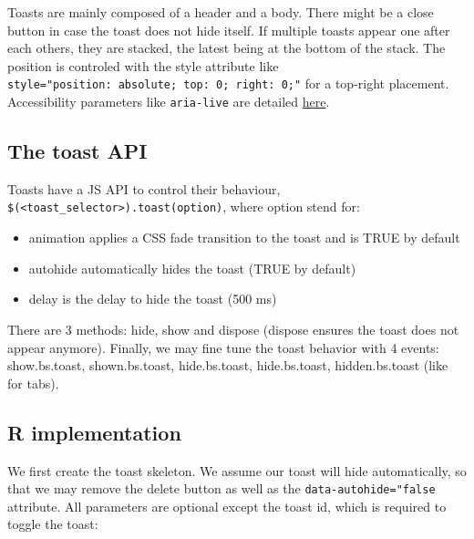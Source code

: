 \documentclass[]{book}
\providecommand{\tightlist}{%
  \setlength{\itemsep}{0pt}\setlength{\parskip}{0pt}}
\begin{document}
Toasts are mainly composed of a header and a body. There might be a close button in case the toast does not hide itself. If multiple toasts appear one after each others, they are stacked, the latest being at the bottom of the stack. The position is controled with the style attribute like \texttt{style="position:\ absolute;\ top:\ 0;\ right:\ 0;"} for a top-right placement. Accessibility parameters like \texttt{aria-live} are detailed \href{https://getbootstrap.com/docs/4.3/components/toasts/\#accessibility}{here}.

\hypertarget{the-toast-api}{%
\subsection{The toast API}\label{the-toast-api}}

Toasts have a JS API to control their behaviour, \texttt{\$(\textquotesingle{}\textless{}toast\_selector\textgreater{}\textquotesingle{}).toast(option)}, where option stend for:

\begin{itemize}
\tightlist
\item
  animation applies a CSS fade transition to the toast and is TRUE by default
\item
  autohide automatically hides the toast (TRUE by default)
\item
  delay is the delay to hide the toast (500 ms)
\end{itemize}

There are 3 methods: hide, show and dispose (dispose ensures the toast does not appear anymore). Finally, we may fine tune the toast behavior with 4 events: show.bs.toast, shown.bs.toast, hide.bs.toast, hide.bs.toast, hidden.bs.toast (like for tabs).

\hypertarget{r-implementation}{%
\subsection{R implementation}\label{r-implementation}}

We first create the toast skeleton. We assume our toast will hide automatically, so that we may remove the delete button as well as the \texttt{data-autohide="false} attribute. All parameters are optional except the toast id, which is required to toggle the toast:
\end{document}
